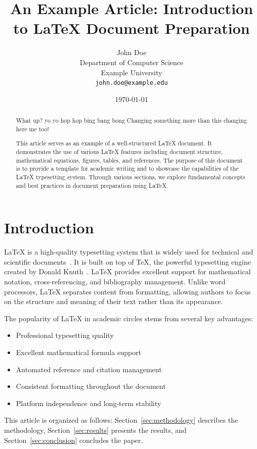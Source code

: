 \documentclass[12pt,a4paper]{article}
\title{An Example Article: Introduction to LaTeX Document Preparation}
\author{John Doe\\
        Department of Computer Science\\
        Example University\\
        \texttt{john.doe@example.edu}}
\date{\today}
\begin{document}
\maketitle

\begin{abstract}
What up? yo yo hop hop bing bang bong
Changing something more than this changing here me too!

This article serves as an example of a well-structured LaTeX document. It demonstrates the use of various LaTeX features including document structure, mathematical equations, figures, tables, and references. The purpose of this document is to provide a template for academic writing and to showcase the capabilities of the LaTeX typesetting system. Through various sections, we explore fundamental concepts and best practices in document preparation using LaTeX.
\end{abstract}

\section{Introduction}
\label{sec:introduction}

LaTeX is a high-quality typesetting system that is widely used for technical and scientific documents~\cite{lamport1994}. It is built on top of TeX, the powerful typesetting engine created by Donald Knuth~\cite{knuth1984}. LaTeX provides excellent support for mathematical notation, cross-referencing, and bibliography management. Unlike word processors, LaTeX separates content from formatting, allowing authors to focus on the structure and meaning of their text rather than its appearance.

The popularity of LaTeX in academic circles stems from several key advantages:
\begin{itemize}
    \item Professional typesetting quality
    \item Excellent mathematical formula support
    \item Automated reference and citation management
    \item Consistent formatting throughout the document
    \item Platform independence and long-term stability
\end{itemize}

This article is organized as follows: Section~\ref{sec:methodology} describes the methodology, Section~\ref{sec:results} presents the results, and Section~\ref{sec:conclusion} concludes the paper.
\end{document}
